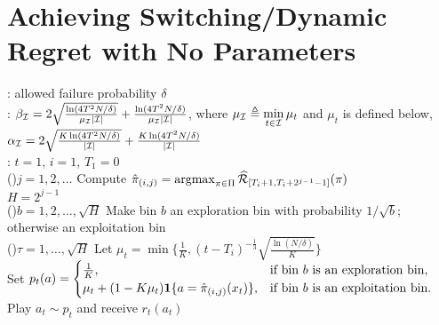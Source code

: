 \section{Achieving Switching/Dynamic Regret with No Parameters}
\label{sec:bin}

\begin{algorithm}[t]
\SetAlgoLined
\setcounter{AlgoLine}{0}
\SetAlgoVlined
\DontPrintSemicolon
\caption{\AdaBIN}\label{alg:AdaGreedy.bin}
: allowed failure probability $\delta$ \\ 
:
$\beta_{\mathcal{I}}= 2\sqrt{\frac{\ln(4T^2N/\delta)}{\mu_{\mathcal{I}} \lvert{\mathcal{I}}\rvert}}+\frac{\ln(4T^2N/\delta)}{\mu_{\mathcal{I}} \lvert{\mathcal{I}}\rvert}$, where $\displaystyle\mu_{\mathcal{I}}\triangleq \min_{t\in{\mathcal{I}}} \mu_t$ and $\mu_t$ is defined below, $\alpha_{\mathcal{I}} = 2\sqrt{\frac{K\ln(4T^2N/\delta)}{\lvert{\mathcal{I}}\rvert}}+\frac{K\ln(4T^2N/\delta)}{\lvert{\mathcal{I}}\rvert}$\\
: $t=1$, $i=1$, $T_1=0$ \label{line:rerun_beginning2}\\
\nl\label{line:adagreedy restart}\For(){$j=1, 2, \ldots$}{ 
\nl Compute $\hat{\pi}_{(i,j)} = \operatorname*{argmax}_{\pi\in\Pi}\widehat{\cal{R}}_{[T_i+1, T_i+2^{j-1}-1]}(\pi)$ 
\\
\nl $H=2^{j-1}$ \\
\nl\label{line:forloop of bin}\For(){$b = 1, 2, \ldots, \sqrt{H}$}{
\nl\label{line:exploration prob}Make bin $b$ an exploration bin with probability $1/\sqrt{b}$; otherwise an exploitation bin\\
\nl\label{line:forloop of bin step}\For(){$\tau = 1, \ldots, \sqrt{H}$}{
\nl       Let $\mu_t=\min\Big\{ \frac{1}{K}, (t-T_i)^{-\frac{1}{3}}\sqrt{\frac{\ln(N/\delta)}{K}} \Big\}$\\
\nl       Set $p_t(a)=\begin{cases}
             \frac{1}{K}, &\text{if bin $b$ is an exploration bin}, \\
             \mu_t+(1-K\mu_t)\boldsymbol{1} \{ a=\hat{\pi}_{(i,j)}(x_t) \}, &\text{if bin $b$ is an exploitation bin}.
          \end{cases}$ \\
\nl       Play $a_t\sim p_t$ and receive $r_t(a_t)$ \\
}}}
\end{algorithm}
